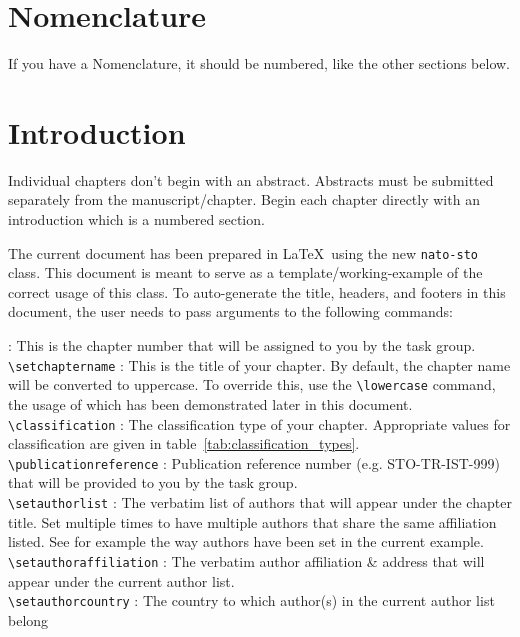 \documentclass{nato-sto}
\begin{document}
\maketitle


\section{Nomenclature}

If you have a Nomenclature, it should be numbered, like the other sections below.

\section{Introduction}

Individual chapters don't begin with an abstract. Abstracts must be submitted separately from the manuscript/chapter. Begin each chapter directly with an introduction which is a numbered section. 

\noindent The current document has been prepared in \LaTeX ~using the new \verb|nato-sto| class. This document is meant to serve as a template/working-example of the correct usage of this class. To auto-generate the title, headers, and footers in this document, the user needs to pass arguments to the following commands:

\noindent {\verb|\setchapternumber|} : This is the chapter number that will be assigned to you by the task group.\\
{\verb|\setchaptername|} : This is the title of your chapter. By default, the chapter name will be converted to uppercase. To override this, use the \verb|\lowercase| command, the usage of which has been demonstrated later in this document.\\
{\verb|\classification|} : The classification type of your chapter. Appropriate values for classification are given in table~\ref{tab:classification_types}.\\
{\verb|\publicationreference|} : Publication reference number (e.g. STO-TR-IST-999) that will be provided to you by the task group.\\
{\verb|\setauthorlist|} : The verbatim list of authors that will appear under the chapter title. Set multiple times to have multiple authors that share the same affiliation listed. See for example the way authors have been set in the current example.\\
{\verb|\setauthoraffiliation|} : The verbatim author affiliation \& address that will appear under the current author list. \\
{\verb|\setauthorcountry|} : The country to which author(s) in the current author list belong
\end{document}
